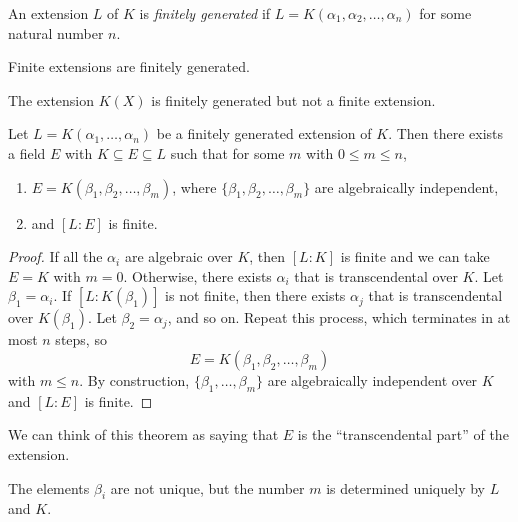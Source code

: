 \begin{definition}
  An extension $L$ of $K$ is \emph{finitely generated}
  if $L = K(\alpha_1, \alpha_2, \dots, \alpha_n)$ for
  some natural number $n$.
\end{definition}

\begin{example}
  Finite extensions are finitely generated.
\end{example}

\begin{example}
  The extension $K(X)$ is finitely generated but not
  a finite extension.
\end{example}

\begin{theorem}
  Let $L = K(\alpha_1, \dots, \alpha_n)$ be a finitely
  generated extension of $K$. Then there exists a field
  $E$ with $K \subseteq E \subseteq L$ such that for
  some $m$ with $0 \le m \le n$,
  \begin{enumerate}
    \item $E = K(\beta_1, \beta_2, \dots, \beta_m)$,
      where $\{\beta_1, \beta_2, \dots, \beta_m\}$ are
      algebraically independent,
    \item and $[L : E]$ is finite.
  \end{enumerate}
\end{theorem}

\begin{proof}
  If all the $\alpha_i$ are algebraic over $K$, then
  $[L : K]$ is finite and we can take $E = K$ with
  $m = 0$. Otherwise, there exists $\alpha_i$ that is
  transcendental over $K$. Let $\beta_1 = \alpha_i$.
  If $[L : K(\beta_1)]$ is not finite, then there exists
  $\alpha_j$ that is transcendental over $K(\beta_1)$.
  Let $\beta_2 = \alpha_j$, and so on. Repeat this
  process, which terminates in at most $n$ steps, so
  \[
    E = K(\beta_1, \beta_2, \dots, \beta_m)
  \]
  with $m \le n$. By construction, $\{\beta_1, \dots, \beta_m\}$
  are algebraically independent over $K$ and
  $[L : E]$ is finite.
\end{proof}

\begin{remark}
  We can think of this theorem as saying that $E$ is
  the ``transcendental part'' of the extension.
\end{remark}

\begin{remark}
  The elements $\beta_i$ are not unique, but the number
  $m$ is determined uniquely by $L$ and $K$.
\end{remark}
